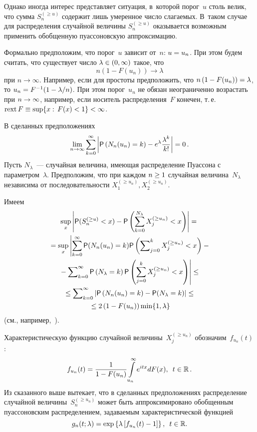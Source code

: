 \begin{multicols}{2}
Однако иногда интерес представляет ситуация, в~которой порог~$u$
столь велик, что сумма $S_n^{(\ge u)}$ содержит лишь умеренное число
слагаемых. В~таком случае для распределения случайной величины
$S_n^{(\ge u)}$ оказывается возможным применить обобщенную
пуассоновскую аппроксимацию.

Формально предположим, что порог~$u$ зависит от~$n$: $u\hm=u_n$. При
этом будем считать, что существует число $\lambda\hm\in(0,\infty)$
такое, что
$$
n\left(1-F(u_n)\right)\longrightarrow \lambda
$$
при $n\to\infty$. Например, если для простоты предположить, что $n\left(1\hm-
F(u_n)\right)\hm=\lambda$, то $u_n\hm=F^{-1}(1-{\lambda}/{n})$. При этом 
порог~$u_n$ не обязан неограниченно возрастать при $n\hm\to\infty$, например, 
если носитель распределения~$F$ конечен, т.\,е.\
 $\mathrm{rext}\,F\hm\equiv\sup\{x:\,F(x)\hm<1\}\hm<\infty$.

В сделанных предположениях
$$
\lim\limits_{n\to\infty}\sum\limits_{k=0}^{\infty}\left\vert {\sf
P}\left(N_n(u_n)=k\right)-e^{\lambda}\displaystyle\frac{\displaystyle \lambda^k\mathstrut}{\displaystyle k!\mathstrut}\right\vert =0\,.
$$
Пусть $N_{\lambda}$~--- случайная величина, имеющая распределение
Пуассона с параметром~$\lambda$. Предположим, что при каждом $n\hm\ge1$
случайная величина~$N_{\lambda}$ независима от последовательности
$X_1^{(\ge u_n)},X_2^{(\ge u_n)}$.

Имеем
\begin{multline*}
\sup\limits_x \left\vert {\sf P}(S_n^{(\ge u)}<x)-{\sf P}
\left(\sum\limits_{k=0}^{N_{\lambda}}X_j^{(\ge u_n)}<x\right)\right\vert =
{}\\
{}
=\sup\limits_x\left\vert \sum\limits_{k=0}^{\infty}{\sf P}(N_n(u_n)=k){\sf P}
\left(\sum\nolimits_{j=0}^kX_j^{(\ge u_n)}<x\right)-{}\right.\hspace*{-1.26616pt}
\\
\left.{}
-\sum\nolimits_{k=0}^{\infty}{\sf P}
\left(N_{\lambda}=k\right){\sf P}\left(\sum\limits_{j=0}^kX_j^{(\ge
u_n)}<x\right)\right\vert \le
{}\\
{}
\le\sum\nolimits_{k=0}^{\infty}\left\vert {\sf P}
\left(N_n(u_n)=k\right)-{\sf P}
(N_{\lambda}=k)\right\vert \le{}\\
{}\le
 2\left(1-F(u_n)\right)
\min\{1,\lambda\}
\end{multline*}
(см., например,~\cite{BarbourHall1984}).

Характеристическую функцию случайной величины~$X_j^{(\ge u_n)}$
обозначим~$f_{u_n}(t)$:
$$
f_{u_n}(t)=\displaystyle\frac{\displaystyle 1\mathstrut}{\displaystyle 1-F(u_n)\mathstrut}\int\limits_{u_n}^{\infty}e^{itx}dF(x),\enskip
t\in\mathbb{R}\,.
$$
Из сказанного выше вытекает, что в сделанных предположениях
распределение случайной величины~$S_n^{(\ge u_n)}$ может быть
аппроксимировано обобщенным пуассоновским распределением, задаваемым
характеристической функцией
$$
g_n(t;\lambda)=\exp\left\{\lambda\left[f_{u_n}(t)-1\right]\right\},\enskip
t\in\mathbb{R}.
$$


\end{multicols}
